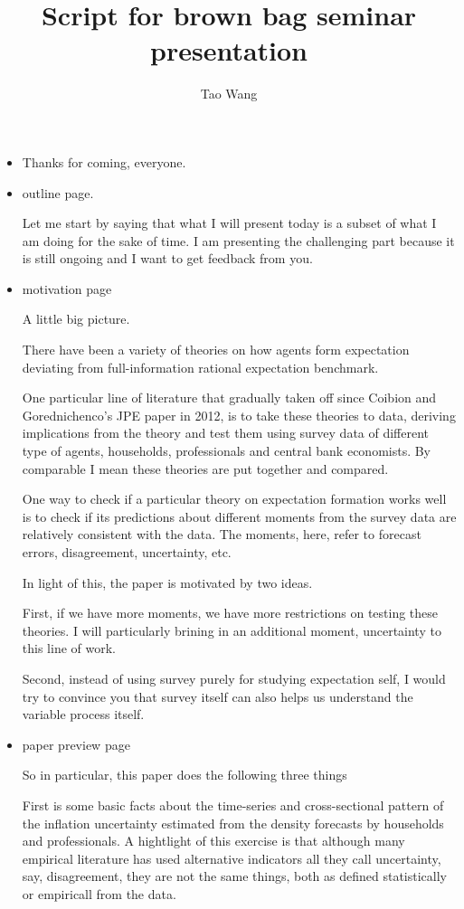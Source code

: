 \documentclass[]{article}
\title{Script for brown bag seminar presentation}
\author{Tao Wang}
\begin{document}
\maketitle


\begin{itemize}
	
	\item 
Thanks for coming, everyone. 

\item outline page.

Let me start by saying that what I will present today is a subset of what I am doing for the sake of time. I am presenting the challenging part because it is still ongoing and I want to get feedback from you. 

\item motivation page 

A little big picture. 

There have been a variety of theories on how agents form expectation deviating from full-information rational expectation benchmark. 

One particular line of literature that gradually taken off since Coibion and Gorednichenco's JPE paper in 2012, is to take these theories to data, deriving implications from the theory and test them using  survey data of different type of agents, households, professionals and central bank economists. By comparable I mean these theories are put together and compared. 

One way to check if a particular theory on expectation formation works well is to check if its predictions about different moments from the survey data are relatively consistent with the data. The moments, here, refer to forecast errors, disagreement, uncertainty, etc. 

In light of this, the paper is motivated by two ideas. 

First, if we have more moments, we have more restrictions on testing these theories. I will particularly brining in an additional moment, uncertainty to this line of work. 

Second, instead of using survey purely for studying expectation self, I would try to convince you that survey itself can also helps us understand the variable process itself. 

\item paper preview page 

So in particular, this paper does the following three things 

First is some basic facts about the time-series and cross-sectional pattern of the inflation uncertainty estimated from the density forecasts by households and professionals. A hightlight of this exercise is that although many empirical literature has used alternative indicators all they call uncertainty, say, disagreement, they are not the same things, both as defined statistically or empiricall from the data. 


\end{itemize}
\end{document}
